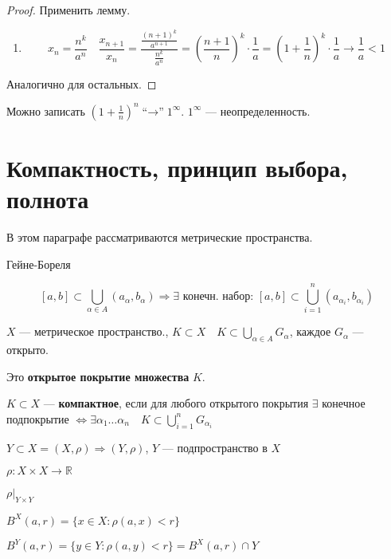 \begin{proof}
    Применить лемму.
    \begin{enumerate}
        \item $$x_n=\frac{n^k}{a^n} \quad \frac{x_{n+1}}{x_n}=\frac{\frac{(n+1)^k}{a^{n+1}}}{\frac{n^k}{a^n}} = (\frac{n+1}{n})^k\cdot\frac{1}{a}=(1+\frac{1}{n})^k\cdot\frac{1}{a}\to\frac{1}{a}<1$$
    \end{enumerate}
    Аналогично для остальных.
\end{proof}

Можно записать $(1+\frac{1}{n})^n \text{``$\to$''} 1^\infty$. $1^\infty$ --- неопределенность.

\section{Компактность, принцип выбора, полнота}

В этом параграфе рассматриваются метрические пространства.

\begin{lemma}
    Гейне-Бореля

    $$[a,b]\subset \bigcup\limits_{\alpha\in A} (a_\alpha, b_\alpha) \Rightarrow \exists \text{ конечн. набор: } [a,b]\subset\bigcup\limits_{i=1}^n(a_{\alpha_i},b_{\alpha_i})$$
\end{lemma}

\begin{definition}
    $X$ --- метрическое пространство., $K\subset X \quad K\subset\bigcup\limits_{\alpha\in A} G_\alpha$, каждое $G_\alpha$ --- открыто.
    
    Это \textbf{открытое покрытие множества} $K$.
\end{definition}

\begin{definition}
    $K\subset X$ --- \textbf{компактное}, если для любого открытого покрытия $\exists$ конечное подпокрытие $\Leftrightarrow \exists \alpha_1\ldots \alpha_n \quad K\subset\bigcup\limits_{i=1}^n G_{\alpha_i}$
\end{definition}

$Y\subset X=(X,\rho) \Rightarrow (Y, \rho)$, $Y$ --- подпространство в $X$

$\rho: X\times X\to\mathbb{R}$

$\rho|_{Y\times Y}$

$B^X(a,r)=\{x\in X: \rho(a,x)<r\}$

$B^Y(a,r)=\{y\in Y:\rho(a, y)<r\} = B^X(a,r)\cap Y$

